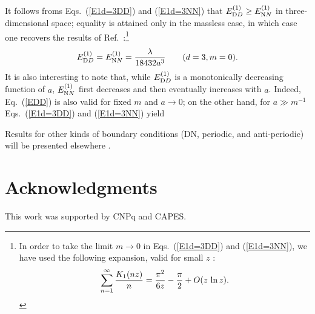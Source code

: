 \documentclass[a4paper,dvips,12pt]{article}
\begin{document}
It follows froms Eqs.\ (\ref{E1d=3DD}) and (\ref{E1d=3NN})
that $E_{\textrm DD}^{(1)}\ge E_{\textrm NN}^{(1)}$ in three-dimensional space;
equality is attained only in the massless case, in which case one
recovers the results of Ref.\ \cite{KrechDietrichPRA92}:\footnote{In order 
to take the limit $m\to 0$ in Eqs.\ (\ref{E1d=3DD}) and (\ref{E1d=3NN}),
we have used the following expansion, valid for small $z$ \cite{Braden}:
$$
\sum_{n=1}^{\infty}{K_{1}(nz)\over n}={\pi^{2}\over 6z}
-{\pi\over 2}+O(z\,\ln z).
$$
}
\begin {equation}
\label {EDD}
E_{\textrm DD}^{(1)}=E_{\textrm NN}^{(1)}={\lambda\over 18432 a^{3}}
\qquad(d=3, m=0).
\end{equation}
It is also interesting to note that, while $E_{\textrm DD}^{(1)}$ is a
monotonically decreasing function of $a$, $E_{\textrm NN}^{(1)}$ first
decreases and then eventually increases with $a$. Indeed, 
Eq.\ (\ref{EDD}) is also valid for fixed $m$ and $a\to 0$; on the other hand,
for $a\gg m^{-1}$ Eqs.\ (\ref{E1d=3DD}) and (\ref{E1d=3NN})
yield
%


Results for other kinds of boundary conditions (DN,
periodic, and anti-periodic) will be presented elsewhere \cite{nostres}.

\section*{Acknowledgments}
 
This work was supported by CNPq and CAPES.
\end{document}
